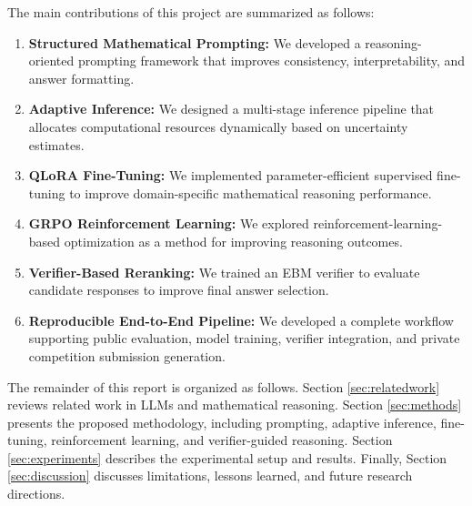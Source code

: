 \documentclass{article}
\begin{document}
The main contributions of this project are summarized as follows:
\begin{enumerate}
    \item \textbf{Structured Mathematical Prompting:} We developed a reasoning-oriented prompting framework that improves consistency, interpretability, and answer formatting.
    \item \textbf{Adaptive Inference:} We designed a multi-stage inference pipeline that allocates computational resources dynamically based on uncertainty estimates.
    \item \textbf{QLoRA Fine-Tuning:} We implemented parameter-efficient supervised fine-tuning to improve domain-specific mathematical reasoning performance.
    \item \textbf{GRPO Reinforcement Learning:} We explored reinforcement-learning-based optimization as a method for improving reasoning outcomes.
    \item \textbf{Verifier-Based Reranking:} We trained an EBM verifier to evaluate candidate responses to improve final answer selection.
    \item \textbf{Reproducible End-to-End Pipeline:} We developed a complete workflow supporting public evaluation, model training, verifier integration, and private competition submission generation.
\end{enumerate}

The remainder of this report is organized as follows. Section \ref{sec:relatedwork} reviews related work in LLMs and mathematical reasoning. Section \ref{sec:methods} presents the proposed methodology, including prompting, adaptive inference, fine-tuning, reinforcement learning, and verifier-guided reasoning. Section \ref{sec:experiments} describes the experimental setup and results. Finally, Section \ref{sec:discussion} discusses limitations, lessons learned, and future research directions.


\end{document}
